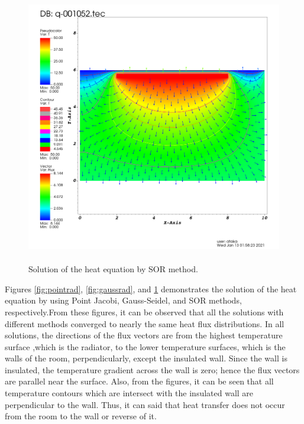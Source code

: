 \documentclass[letterpaper,12pt]{article}
\begin{document}
\begin{figure}[H] 
	\centering 
	\includegraphics[max height=12cm]{graphs/SOR_O19_rad_default/SOR_O19_rad_default.png}
	\caption{Solution of the heat equation by SOR method.}
 	\label{fig:sorrad}
\end{figure}
Figures \ref{fig:pointrad}, \ref{fig:gaussrad}, and \ref{fig:sorrad}
demonstrates the solution of the heat equation by using Point Jacobi, Gauss-Seidel,
and SOR methods, respectively.From these figures, it can be observed that all the solutions
with different methods converged to nearly the same heat flux distributions.
In all solutions, the directions of the flux vectors are from the highest temperature surface
,which is the radiator, to the lower temperature surfaces, which is the walls of the room,
perpendicularly, except the insulated wall. Since the wall is insulated, the temperature
gradient across the wall is zero; hence the flux vectors are parallel near the surface.
Also, from the figures, it can be seen that all temperature contours which are intersect
with the insulated wall are perpendicular to the wall. Thus, it can said that heat transfer
does not occur from the room to the wall or reverse of it.
\end{document}
